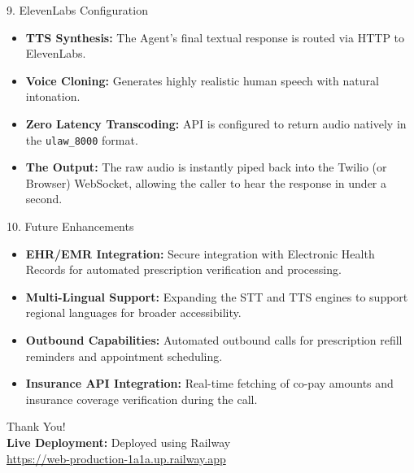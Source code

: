 \documentclass{beamer}
\begin{document}
\begin{frame}{9. ElevenLabs Configuration}
    \begin{itemize}
        \item \textbf{TTS Synthesis:} The Agent's final textual response is routed via HTTP to ElevenLabs.
        \item \textbf{Voice Cloning:} Generates highly realistic human speech with natural intonation.
        \item \textbf{Zero Latency Transcoding:} API is configured to return audio natively in the \texttt{ulaw\_8000} format.
        \item \textbf{The Output:} The raw audio is instantly piped back into the Twilio (or Browser) WebSocket, allowing the caller to hear the response in under a second.
    \end{itemize}
\end{frame}

\begin{frame}{10. Future Enhancements}
    \begin{itemize}
        \item \textbf{EHR/EMR Integration:} Secure integration with Electronic Health Records for automated prescription verification and processing.
        \item \textbf{Multi-Lingual Support:} Expanding the STT and TTS engines to support regional languages for broader accessibility.
        \item \textbf{Outbound Capabilities:} Automated outbound calls for prescription refill reminders and appointment scheduling.
        \item \textbf{Insurance API Integration:} Real-time fetching of co-pay amounts and insurance coverage verification during the call.
    \end{itemize}
\end{frame}

\begin{frame}
    \centering
    \Huge Thank You! \\
    \vspace{1cm}
    \large
    \textbf{Live Deployment:} Deployed using Railway \\
    \vspace{0.2cm}
    \normalsize
    \href{https://web-production-1a1a.up.railway.app}{https://web-production-1a1a.up.railway.app}
\end{frame}
\end{document}
